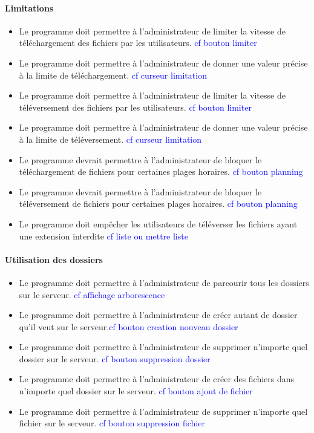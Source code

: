 \documentclass[10pt,a4paper]{report}
\begin{document}
\paragraph{Limitations}
	\begin{itemize}[label = $\triangleright$]
		\item Le programme doit permettre à l'administrateur de limiter la vitesse de téléchargement des fichiers par les utilisateurs. \textcolor{blue}{cf bouton limiter}
		\item Le programme doit permettre à l'administrateur de donner une valeur précise à la limite de téléchargement. \textcolor{blue}{cf curseur limitation}
		\item Le programme doit permettre à l'administrateur de limiter la vitesse de téléversement des fichiers par les utilisateurs. \textcolor{blue}{cf bouton limiter}
		\item Le programme doit permettre à l'administrateur de donner une valeur précise à la limite de téléversement. \textcolor{blue}{cf curseur limitation}
		\item Le programme devrait permettre à l'administrateur de bloquer le téléchargement de fichiers pour certaines plages horaires. \textcolor{blue}{cf bouton planning}
		\item Le programme devrait permettre à l'administrateur de bloquer le téléversement de fichiers pour certaines plages horaires. \textcolor{blue}{cf bouton planning}
		\item Le programme doit empêcher les utilisateurs de téléverser les fichiers ayant une extension interdite \textcolor{blue}{cf liste ou mettre liste}
	\end{itemize}
	
\paragraph{Utilisation des dossiers}
	\begin{itemize}[label = $\triangleright$]
		\item Le programme doit permettre à l'administrateur de parcourir tous les dossiers sur le serveur. \textcolor{blue}{cf affichage arborescence}
		\item Le programme doit permettre à l'administrateur de créer autant de dossier qu'il veut sur le serveur.\textcolor{blue}{cf bouton creation nouveau dossier}
		\item Le programme doit permettre à l'administrateur de supprimer n'importe quel dossier sur le serveur. \textcolor{blue}{cf bouton suppression dossier}
		\item Le programme doit permettre à l'administrateur de créer des fichiers dans n'importe quel dossier sur le serveur. \textcolor{blue}{cf bouton ajout de fichier}
		\item Le programme doit permettre à l'administrateur de supprimer n'importe quel fichier sur le serveur. \textcolor{blue}{cf bouton suppression fichier}
	\end{itemize}
\end{document}
